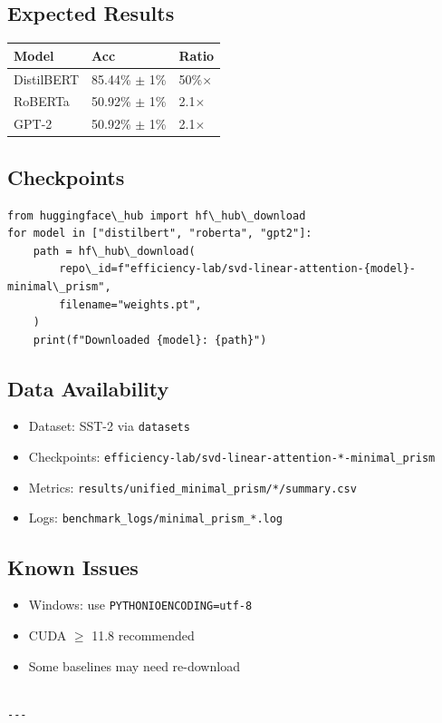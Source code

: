 \subsection{Expected Results}

\begin{table}[H]
\centering
\small
\begin{tabular}{lll}
\toprule
\textbf{Model} & \textbf{Acc} & \textbf{Ratio} \\
\midrule
DistilBERT & 85.44\% $\pm$ 1\% & 50\%$\times$ \\
RoBERTa & 50.92\% $\pm$ 1\% & 2.1$\times$ \\
GPT-2 & 50.92\% $\pm$ 1\% & 2.1$\times$ \\
\bottomrule
\end{tabular}
\end{table}

\subsection{Checkpoints}

\begin{lstlisting}
from huggingface\_hub import hf\_hub\_download
for model in ["distilbert", "roberta", "gpt2"]:
    path = hf\_hub\_download(
        repo\_id=f"efficiency-lab/svd-linear-attention-{model}-minimal\_prism",
        filename="weights.pt",
    )
    print(f"Downloaded {model}: {path}")
\end{lstlisting}

\subsection{Data Availability}

\begin{itemize}
\item Dataset: SST-2 via \texttt{datasets}
\item Checkpoints: \texttt{efficiency-lab/svd-linear-attention-*-minimal\_prism}
\item Metrics: \texttt{results/unified\_minimal\_prism/*/summary.csv}
\item Logs: \texttt{benchmark\_logs/minimal\_prism\_*.log}

\end{itemize}
\subsection{Known Issues}

\begin{itemize}
\item Windows: use \texttt{PYTHONIOENCODING=utf-8}
\item CUDA $\ge$ 11.8 recommended
\item Some baselines may need re-download
\end{itemize}
\begin{lstlisting}

---
\end{lstlisting}